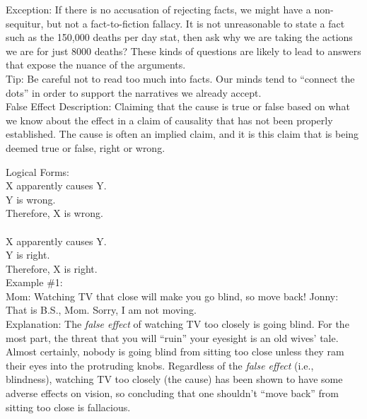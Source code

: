 \documentclass[a4paper,12pt,single,pdftex]{scrartcl}
\begin{document}
    
      Exception: If there is no accusation of rejecting facts, we might have a non-sequitur, but not a fact-to-fiction fallacy. It is not unreasonable to state a fact such as the 150,000 deaths per day stat, then ask why we are taking the actions we are for just 8000 deaths? These kinds of questions are likely to lead to answers that expose the nuance of the arguments.
    \\

    
      Tip: Be careful not to read too much into facts. Our minds tend to “connect the dots” in order to support the narratives we already accept.
    \\

  

False Effect
    Description: Claiming that the cause is true or false based on what we know about the effect in a claim of causality that has not been properly established. The cause is often an implied claim, and it is this claim that is being deemed true or false, right or wrong.

    
      Logical Forms:
    \\

    
      X apparently causes Y.
    \\

    
      Y is wrong.
    \\

    
      Therefore, X is wrong.
    \\

    
       
    \\

    
      X apparently causes Y.
    \\

    
      Y is right.
    \\

    
      Therefore, X is right.
    \\

    
      Example \#1:
    \\

    
      Mom: Watching TV that close will make you go blind, so move back! \newline
Jonny: That is B.S., Mom. Sorry, I am not moving.
    \\

    
      Explanation: The {\em false effect} of watching TV too closely is going blind. For the most part, the threat that you will “ruin” your eyesight is an old wives’ tale. Almost certainly, nobody is going blind from sitting too close unless they ram their eyes into the protruding knobs. Regardless of the {\em false effect} (i.e., blindness), watching TV too closely (the cause) has been shown to have some adverse effects on vision, so concluding that one shouldn’t “move back” from sitting too close is fallacious.
    \\
\end{document}
